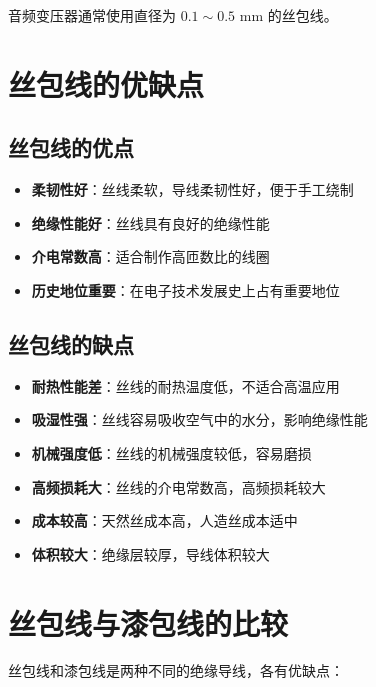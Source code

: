 \documentclass[12pt,UTF8]{ctexbook}
\begin{document}
音频变压器通常使用直径为 $0.1 \sim 0.5$ mm 的丝包线。

\section{丝包线的优缺点}

\subsection{丝包线的优点}

\begin{itemize}[leftmargin=2cm]
    \item \textbf{柔韧性好}：丝线柔软，导线柔韧性好，便于手工绕制
    \item \textbf{绝缘性能好}：丝线具有良好的绝缘性能
    \item \textbf{介电常数高}：适合制作高匝数比的线圈
    \item \textbf{历史地位重要}：在电子技术发展史上占有重要地位
\end{itemize}

\subsection{丝包线的缺点}

\begin{itemize}[leftmargin=2cm]
    \item \textbf{耐热性能差}：丝线的耐热温度低，不适合高温应用
    \item \textbf{吸湿性强}：丝线容易吸收空气中的水分，影响绝缘性能
    \item \textbf{机械强度低}：丝线的机械强度较低，容易磨损
    \item \textbf{高频损耗大}：丝线的介电常数高，高频损耗较大
    \item \textbf{成本较高}：天然丝成本高，人造丝成本适中
    \item \textbf{体积较大}：绝缘层较厚，导线体积较大
\end{itemize}

\section{丝包线与漆包线的比较}

丝包线和漆包线是两种不同的绝缘导线，各有优缺点：
\end{document}
